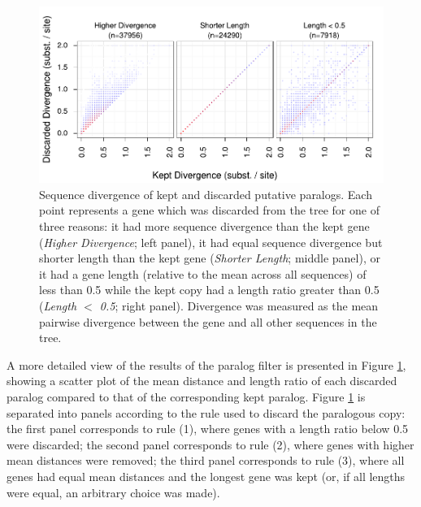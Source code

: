 \begin{figure}
\centering
\includegraphics[scale=0.9]{Figs/mammals_paralogs_scatter.pdf}
\caption{Sequence divergence of kept and discarded putative
  paralogs. Each point represents a gene which was discarded from the
  tree for one of three reasons: it had more sequence divergence than
  the kept gene (\emph{Higher Divergence}; left panel), it had equal
  sequence divergence but shorter length than the kept gene
  (\emph{Shorter Length}; middle panel), or it had a gene length
  (relative to the mean across all sequences) of less than 0.5 while
  the kept copy had a length ratio greater than 0.5 (\emph{Length
    $<$ 0.5}; right panel). Divergence was measured as the mean
  pairwise divergence between the gene and all other sequences in the
  tree.}
\label{filtered_paralogs_scatter}
\end{figure}

A more detailed view of the results of the paralog filter is presented
in Figure \ref{filtered_paralogs_scatter}, showing a scatter plot of
the mean distance and length ratio of each discarded paralog compared
to that of the corresponding kept paralog. Figure
\ref{filtered_paralogs_scatter} is separated into panels according to
the rule used to discard the paralogous copy: the first panel
corresponds to rule (1), where genes with a length ratio below 0.5
were discarded; the second panel corresponds to rule (2), where genes
with higher mean distances were removed; the third panel corresponds
to rule (3), where all genes had equal mean distances and the longest
gene was kept (or, if all lengths were equal, an arbitrary choice was
made).

